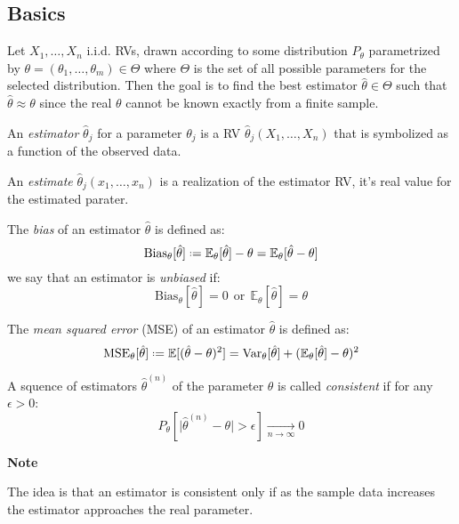 \documentclass[8pt,a4paper]{extarticle}     %
\newcommand{\colnull}{\vfill\null\columnbreak}
\newcommand{\eqdef}{\mathrel{\vcenter{\baselineskip0.5ex\lineskiplimit0pt\hbox{\scriptsize.}\hbox{\scriptsize.}}}=}
\newcommand{\Var}{\mathrm{Var}}
\begin{document}
\begin{multicols}{4}
\subsection{Basics}
\noindent 
Let $X_1,\dots,X_n$ i.i.d. RVs, drawn according to some distribution $P_\theta$ parametrized by $\theta=(\theta_1,\dots,\theta_m)\in\Theta$ where $\Theta$ is the set of all possible parameters for the selected distribution. Then the goal is to find the best estimator $\hat{\theta}\in\Theta$ such that $\hat{\theta}\approx\theta$ since the real $\theta$ cannot be known exactly from a finite sample. 
\\
\begin{boxdefinition}[Estimator] 
	An \textit{estimator} $\hat{\theta}_j$ for a parameter $\theta_j$ is a RV $\hat{\theta}_j(X_1,\dots,X_n)$ that is symbolized as a function of the observed data. 
\end{boxdefinition}
\begin{boxdefinition}[Estimate] 
	An \textit{estimate} $\hat{\theta}_j(x_1,\dots,x_n)$ is a realization of the estimator RV, it's real value for the estimated parater. 
\end{boxdefinition}
\begin{boxdefinition}[Bias] 
	The \textit{bias} of an estimator $\hat{\theta}$ is defined as:
	\[
		\mathrm{Bias}_\theta[\hat{\theta}]\eqdef\mathbb{E}_\theta[\hat{\theta}]-\theta=\mathbb{E}_\theta[\hat{\theta}-\theta]
	\]
	we say that an estimator is \textit{unbiased} if:
	\[
		\mathrm{Bias}_\theta[\hat{\theta}]=0 \ \ \text{or} \ \ \mathbb{E}_\theta[\hat{\theta}]=\theta  
	\]
\end{boxdefinition}
\begin{boxdefinition} 
	The \textit{mean squared error} (MSE) of an estimator $\hat{\theta}$ is defined as: 
	\[
		\mathrm{MSE}_\theta[\hat{\theta}] \eqdef
		\mathbb{E}[(\hat{\theta}-\theta)^2] = 
		\Var_\theta[\hat{\theta}]+(\mathbb{E}_\theta[\hat{\theta}]-\theta)^2
	\]
\end{boxdefinition}
\begin{boxdefinition}[Consistent] 
	A squence of estimators $\hat{\theta}^{(n)}$ of the parameter $\theta$ is called \textit{consistent} if for any $\epsilon>0$:
	\[
		P_\theta[\lvert\hat{\theta}^{(n)}-\theta\rvert>\epsilon]\xrightarrow[n\rightarrow\infty]{} 0
	\]
\end{boxdefinition}
\begin{listb}
	\item [] \textbf{Note}
	\item The idea is that an estimator is consistent only if as the sample data increases the estimator approaches the real parameter. 
\end{listb}
\colnull 



\end{multicols}
\end{document}
